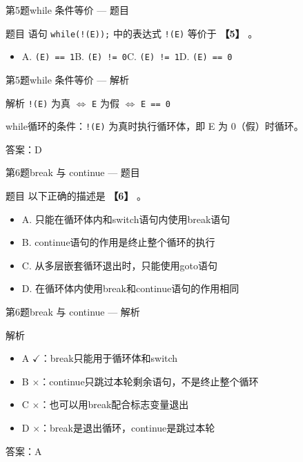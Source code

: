 \begin{frame}{第5题}{while 条件等价 --- 题目}
    \begin{exampleblock}{题目}
        语句 \texttt{while(!(E));} 中的表达式 \texttt{!(E)} 等价于 \textbf{【5】} 。
        \begin{itemize}
            \item A. \texttt{(E) == 1}\quad B. \texttt{(E) != 0}\quad C. \texttt{(E) != 1}\quad D. \texttt{(E) == 0}
        \end{itemize}
    \end{exampleblock}
\end{frame}

\begin{frame}{第5题}{while 条件等价 --- 解析}
    \begin{alertblock}{解析}
        \texttt{!(E)} 为真 $\Leftrightarrow$ \texttt{E} 为假 $\Leftrightarrow$ \texttt{E == 0}

        while循环的条件：\texttt{!(E)} 为真时执行循环体，即 E 为 0（假）时循环。
        \vspace{0.5em}

        {\color{highlight}答案：D}
    \end{alertblock}
\end{frame}

\begin{frame}{第6题}{break 与 continue --- 题目}
    \begin{exampleblock}{题目}
        \small 以下正确的描述是 \textbf{【6】} 。
        \begin{itemize}
            \setlength{\itemsep}{0pt}
            \item A. 只能在循环体内和switch语句内使用break语句
            \item B. continue语句的作用是终止整个循环的执行
            \item C. 从多层嵌套循环退出时，只能使用goto语句
            \item D. 在循环体内使用break和continue语句的作用相同
        \end{itemize}
    \end{exampleblock}
\end{frame}

\begin{frame}{第6题}{break 与 continue --- 解析}
    \begin{alertblock}{解析}
        \footnotesize
        \begin{itemize}
            \setlength{\itemsep}{0pt}
            \item A $\checkmark$：break只能用于循环体和switch
            \item B $\times$：continue只跳过本轮剩余语句，不是终止整个循环
            \item C $\times$：也可以用break配合标志变量退出
            \item D $\times$：break是退出循环，continue是跳过本轮
        \end{itemize}
        {\color{highlight}答案：A}
    \end{alertblock}
\end{frame}

